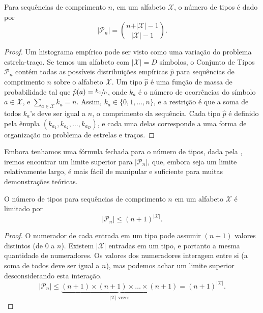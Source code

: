 \begin{theorem}\label{thm:numtiposn}
 Para sequências de comprimento $n$, em um alfabeto $\mathcal{X}$, o número de tipos é dado por
 \begin{equation}\label{eq:number-of-types}
 \vert \mathcal{P}_n \vert = {n + \vert \mathcal{X} \vert - 1 \choose \vert \mathcal{X} \vert - 1} .
 \end{equation}
\end{theorem}
\begin{proof}
Um histograma empírico pode ser visto como uma variação do problema estrela-traço.
Se temos um alfabeto com $\vert\mathcal{X}\vert = D$ símbolos,
o Conjunto de Tipos $\mathcal{P}_n$ contém todas as possíveis distribuições empíricas $\hat{p}$
para sequências de comprimento $n$ sobre o alfabeto $\mathcal{X}$.
Um tipo $\hat{p}$ é uma função de massa de probabilidade tal que $\hat{p}(a) = \sfrac{k_a}{n}$,
onde $k_a$ é o número de ocorrências do símbolo $a \in \mathcal{X}$, e
$\sum_{a \in \mathcal{X}} k_a = n$. Assim, $k_a \in \{0,1, \ldots, n\}$, e a restrição
é que a soma de todos $k_a$'s deve ser igual a $n$, o comprimento da sequência.
Cada tipo $\hat{p}$ é definido pela ênupla $(k_{a_1}, k_{a_2}, \ldots, k_{a_D})$, e cada
uma delas corresponde a uma forma de organização no problema de estrelas e traços.
\end{proof}


Embora tenhamos uma fórmula fechada para o número de tipos, dada pela ,
iremos encontrar um limite superior para $\vert \mathcal{P}_n \vert$,
que, embora seja um limite relativamente largo, é mais fácil de manipular e suficiente 
para muitas demonstrações teóricas. 

\begin{theorem}\label{thm:limnumtipos}
 O número de tipos para sequências de comprimento $n$ em um alfabeto $\mathcal{X}$ é limitado por
 \begin{equation}\label{eq:number-of-types-bound}
 \vert \mathcal{P}_n \vert \leq (n+1)^{\vert \mathcal{X} \vert} .
 \end{equation}
\end{theorem}

\begin{proof}
 O numerador de cada entrada em um tipo pode assumir $(n+1)$ valores distintos (de $0$ a $n$).
 Existem $\vert \mathcal{X} \vert$ entradas em um tipo, e portanto a mesma quantidade de numeradores.
 Os valores dos numeradores interagem entre si (a soma de todos deve ser igual a $n$), mas podemos
 achar um limite superior desconsiderando esta interação.
 \begin{equation}
 \vert \mathcal{P}_n \vert \leq \underbrace{(n+1)\times(n+1)\times\ldots\times(n+1)}_{\vert \mathcal{X} \vert \text{ vezes}} = (n+1)^{\vert \mathcal{X} \vert} .
 \end{equation}
\end{proof}

